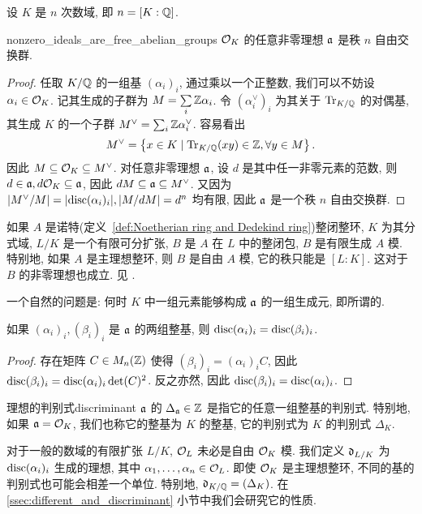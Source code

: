 设 $K$ 是 $n$ 次数域, 即 $n=[K:{\mathbb{Q}}]$.
\begin{theorem}{}{nonzero_ideals_are_free_abelian_groups}
${\mathcal{O}}_K$ 的任意非零理想 ${\mathfrak{a}}$ 是秩 $n$ 自由交换群.
\end{theorem}
\begin{proof}
任取 $K/{\mathbb{Q}}$ 的一组基 $(\alpha_i)_i$, 通过乘以一个正整数, 我们可以不妨设 $\alpha_i\in{\mathcal{O}}_K$. 记其生成的子群为 $M=\sum\limits_i {\mathbb{Z}}\alpha_i$. 令 $(\alpha_i^\vee)_i$ 为其关于 ${\mathrm{Tr}}_{K/{\mathbb{Q}}}$ 的对偶基, 其生成 $K$ 的一个子群 $M^\vee=\sum_i {\mathbb{Z}}\alpha_i^\vee$. 容易看出
  \[M^\vee=\left\{x\in K\mid {\mathrm{Tr}}_{K/{\mathbb{Q}}}(xy)\in{\mathbb{Z}},\forall y\in M\right\}.\]
因此 $M\subseteq {\mathcal{O}}_K\subseteq M^\vee$. 对任意非零理想 ${\mathfrak{a}}$, 设 $d$ 是其中任一非零元素的范数, 则 $d\in {\mathfrak{a}},d{\mathcal{O}}_K\subseteq {\mathfrak{a}}$, 因此 $dM\subseteq {\mathfrak{a}}\subseteq M^\vee$. 又因为 $|M^\vee/M|=|{\mathrm{disc}}(\alpha_i)_i|,|M/dM|=d^n$ 均有限, 因此 ${\mathfrak{a}}$ 是一个秩 $n$ 自由交换群.
\end{proof}

\begin{remark}\label{rem:integral_closure_over_pid_admits_basis}
如果 $A$ 是诺特(定义~\ref{def:Noetherian ring and Dedekind ring})整闭整环, $K$ 为其分式域, $L/K$ 是一个有限可分扩张, $B$ 是 $A$ 在 $L$ 中的整闭包, $B$ 是有限生成 $A$ 模. 特别地, 如果 $A$ 是主理想整环, 则 $B$ 是自由 $A$ 模, 它的秩只能是 $[L:K]$. 这对于 $B$ 的非零理想也成立. 见 \cite[I \S2, Theorem~1]{Lang1994}.
\end{remark}

一个自然的问题是: 何时 $K$ 中一组元素能够构成 ${\mathfrak{a}}$ 的一组生成元, 即所谓的.

\begin{proposition}{}{}
如果 $(\alpha_i)_i,(\beta_i)_i$ 是 ${\mathfrak{a}}$ 的两组整基, 则 ${\mathrm{disc}}(\alpha_i)_i={\mathrm{disc}}(\beta_i)_i$.
\end{proposition}
\begin{proof}
存在矩阵 $C\in M_n({\mathbb{Z}})$ 使得 $(\beta_i)_i=(\alpha_i)_i C$, 因此 ${\mathrm{disc}}(\beta_i)_i={\mathrm{disc}}(\alpha_i)_i\det(C)^2$. 反之亦然, 因此 ${\mathrm{disc}}(\beta_i)_i={\mathrm{disc}}(\alpha_i)_i$.
\end{proof}

\begin{definition}{理想的判别式}{discriminant}
${\mathfrak{a}}$ 的 $\Delta_{\mathfrak{a}}\in{\mathbb{Z}}$ 是指它的任意一组整基的判别式. 特别地, 如果 ${\mathfrak{a}}={\mathcal{O}}_K$, 我们也称它的整基为 $K$ 的整基, 它的判别式为 $K$ 的判别式 $\Delta_K$.
\end{definition}

\begin{remark}
对于一般的数域的有限扩张 $L/K$, ${\mathcal{O}}_L$ 未必是自由 ${\mathcal{O}}_K$ 模. 我们定义 ${\mathfrak{d}}_{L/K}$ 为 ${\mathrm{disc}}(\alpha_i)_i$ 生成的理想, 其中 $\alpha_1,\dots,\alpha_n\in {\mathcal{O}}_L$. 即使 ${\mathcal{O}}_K$ 是主理想整环, 不同的基的判别式也可能会相差一个单位. 特别地, ${\mathfrak{d}}_{K/{\mathbb{Q}}}=(\Delta_K)$. 在 \ref{ssec:different_and_discriminant} 小节中我们会研究它的性质.
\end{remark}

